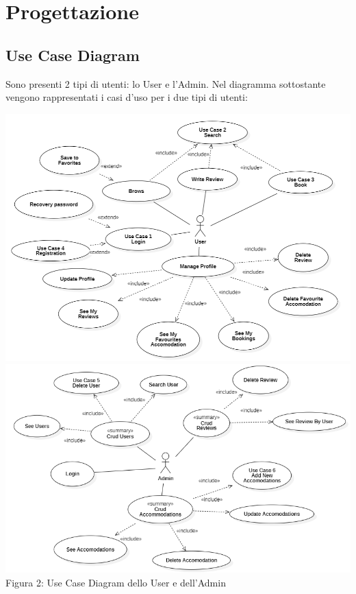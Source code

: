 \documentclass[10pt]{article}
\begin{document}
\section{Progettazione}
\subsection{Use Case Diagram}

Sono presenti 2 tipi di utenti: lo User e l'Admin. Nel diagramma sottostante vengono rappresentati i casi d'uso per i due tipi di utenti: 

\begin{center}
\includegraphics[scale=0.411]{usecases/ClientUseCase}
\includegraphics[scale=0.5]{usecases/AdminUseCase}\\
Figura 2: Use Case Diagram dello User e dell'Admin
\end{center}
\end{document}
